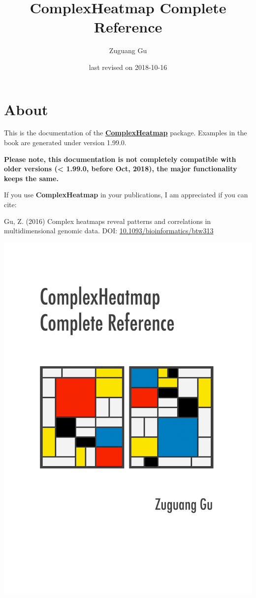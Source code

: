 \documentclass[]{book}
\title{ComplexHeatmap Complete Reference}
\author{Zuguang Gu}
\date{last revised on 2018-10-16}
\theoremstyle{definition}
\theoremstyle{definition}
\theoremstyle{definition}
\theoremstyle{remark}
\begin{document}
\maketitle

{
\setcounter{tocdepth}{1}
\tableofcontents
}
\chapter*{About}\label{about}

This is the documentation of the
\href{http://bioconductor.org/packages/ComplexHeatmap/}{\textbf{ComplexHeatmap}}
package. Examples in the book are generated under version 1.99.0.

\textbf{Please note, this documentation is not completely compatible
with older versions (\textless{} 1.99.0, before Oct, 2018), the major
functionality keeps the same.}

If you use \textbf{ComplexHeatmap} in your publications, I am
appreciated if you can cite:

Gu, Z. (2016) Complex heatmaps reveal patterns and correlations in
multidimensional genomic data. DOI:
\href{https://doi.org/10.1093/bioinformatics/btw313}{10.1093/bioinformatics/btw313}

\begin{center}\includegraphics[width=34.44in]{complexheatmap-cover} \end{center}
\end{document}
